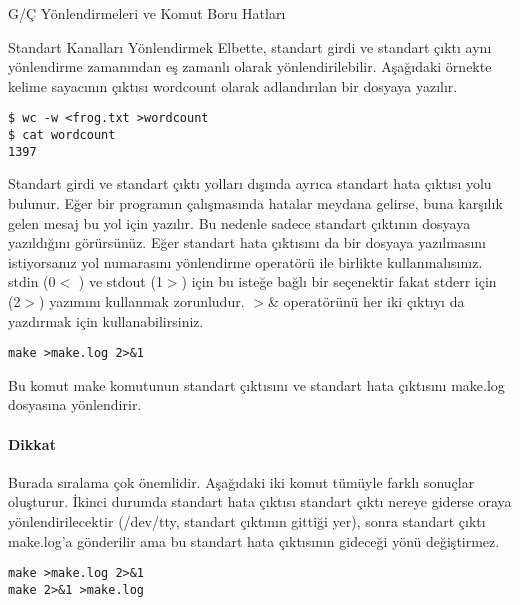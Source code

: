 \begin{section}{G/Ç Yönlendirmeleri ve Komut Boru Hatları}
\begin{subsection}{Standart Kanalları Yönlendirmek}
Elbette, standart girdi ve standart çıktı aynı yönlendirme zamanından eş zamanlı olarak yönlendirilebilir.  Aşağıdaki örnekte kelime sayacının çıktısı wordcount olarak adlandırılan bir dosyaya yazılır.
\footnotesize
\begin{verbatim}
$ wc -w <frog.txt >wordcount 
$ cat wordcount 
1397
\end{verbatim}
\normalsize

Standart girdi ve standart çıktı yolları dışında ayrıca standart hata çıktısı yolu bulunur. Eğer bir programın çalışmasında hatalar meydana gelirse, buna karşılık gelen mesaj bu yol için yazılır. Bu nedenle sadece standart çıktının dosyaya yazıldığını görürsünüz. Eğer standart hata çıktısını da bir dosyaya yazılmasını istiyorsanız yol numarasını yönlendirme operatörü ile birlikte kullanmalısınız. stdin (0$<$ ) ve stdout (1$>$) için bu isteğe bağlı bir seçenektir fakat stderr için (2$>$) yazımını kullanmak zorunludur. $>$\& operatörünü her iki çıktıyı da yazdırmak için kullanabilirsiniz.
\footnotesize
\begin{verbatim}
make >make.log 2>&1
\end{verbatim}
\normalsize

Bu komut make komutunun standart çıktısını ve standart hata çıktısını make.log dosyasına yönlendirir.

\paragraph{Dikkat}{ Burada sıralama çok önemlidir. Aşağıdaki iki komut tümüyle farklı sonuçlar oluşturur. İkinci durumda standart hata çıktısı standart çıktı nereye giderse oraya yönlendirilecektir (/dev/tty, standart çıktının gittiği yer), sonra standart çıktı make.log'a gönderilir ama bu standart hata çıktısının gideceği yönü değiştirmez.}
\footnotesize
\begin{verbatim}
make >make.log 2>&1 
make 2>&1 >make.log 
\end{verbatim}
\normalsize


\end{subsection}
\end{section}

